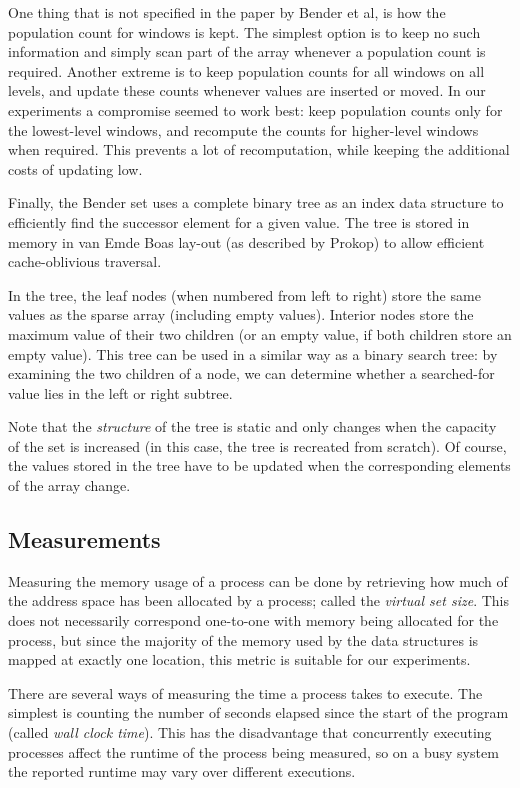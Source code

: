 \documentclass{acm_proc_article-sp}
\begin{document}
One thing that is not specified in the paper by Bender et al, is how the
population count for windows is kept. The simplest option is to keep no such
information and simply scan part of the array whenever a population count is
required. Another extreme is to keep population counts for all windows on all
levels, and update these counts whenever values are inserted or moved. In
our experiments a compromise seemed to work best: keep population counts only
for the lowest-level windows, and recompute the counts for higher-level windows
when required. This prevents a lot of recomputation, while keeping the additional
costs of updating low.

Finally, the Bender set uses a complete binary tree as an index data structure
to efficiently find the successor element for a given value. The tree is
stored in memory in van Emde Boas lay-out (as described by Prokop) to allow
efficient cache-oblivious traversal.

In the tree, the leaf nodes (when numbered from left to right) store the same values
as the sparse array (including empty values).
Interior nodes store the maximum value of their two children (or an empty value,
if both children store an empty value).
This tree can be used in a similar way as a binary search tree: by examining the
two children of a node, we can determine whether a searched-for value lies in the
left or right subtree.

Note that the \emph{structure} of the tree is static and only changes when the
capacity of the set is increased (in this case, the tree is recreated from scratch).
Of course, the values stored in the tree have to be updated when the corresponding
elements of the array change.

\subsection{Measurements}
Measuring the memory usage of a process can be done by retrieving how much of the
address space has been allocated by a process; called the \emph{virtual set
size}. This does not necessarily correspond one-to-one with memory being allocated for the process, but since the majority of the memory used by the
data structures is mapped at exactly one location, this metric is suitable
for our experiments.

There are several ways of measuring the time a process takes to execute.
The simplest is counting the number of seconds elapsed since the start of the
program (called \emph{wall clock time}).
This has the disadvantage that concurrently executing processes affect the runtime
of the process being measured, so on a busy system the reported runtime may vary
over different executions.
\end{document}
